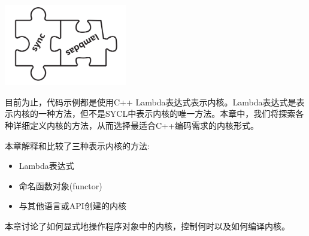 \begin{center}
	\includegraphics[width=0.4\textwidth]{content/chapter-10/images/1}
\end{center}

目前为止，代码示例都是使用C++ Lambda表达式表示内核。Lambda表达式是表示内核的一种方法，但不是SYCL中表示内核的唯一方法。本章中，我们将探索各种详细定义内核的方法，从而选择最适合C++编码需求的内核形式。\par

本章解释和比较了三种表示内核的方法:\par

\begin{itemize}
	\item Lambda表达式
	\item 命名函数对象(functor)
	\item 与其他语言或API创建的内核
\end{itemize}

本章讨论了如何显式地操作程序对象中的内核，控制何时以及如何编译内核。\par




